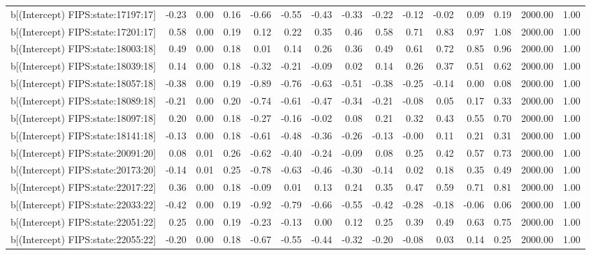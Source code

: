 \begin{table}[ht]
\begin{tabular}{rrrrrrrrrrrrrrr}
  b[(Intercept) FIPS:state:17197:17] & -0.23 & 0.00 & 0.16 & -0.66 & -0.55 & -0.43 & -0.33 & -0.22 & -0.12 & -0.02 & 0.09 & 0.19 & 2000.00 & 1.00 \\ 
  b[(Intercept) FIPS:state:17201:17] & 0.58 & 0.00 & 0.19 & 0.12 & 0.22 & 0.35 & 0.46 & 0.58 & 0.71 & 0.83 & 0.97 & 1.08 & 2000.00 & 1.00 \\ 
  b[(Intercept) FIPS:state:18003:18] & 0.49 & 0.00 & 0.18 & 0.01 & 0.14 & 0.26 & 0.36 & 0.49 & 0.61 & 0.72 & 0.85 & 0.96 & 2000.00 & 1.00 \\ 
  b[(Intercept) FIPS:state:18039:18] & 0.14 & 0.00 & 0.18 & -0.32 & -0.21 & -0.09 & 0.02 & 0.14 & 0.26 & 0.37 & 0.51 & 0.62 & 2000.00 & 1.00 \\ 
  b[(Intercept) FIPS:state:18057:18] & -0.38 & 0.00 & 0.19 & -0.89 & -0.76 & -0.63 & -0.51 & -0.38 & -0.25 & -0.14 & 0.00 & 0.08 & 2000.00 & 1.00 \\ 
  b[(Intercept) FIPS:state:18089:18] & -0.21 & 0.00 & 0.20 & -0.74 & -0.61 & -0.47 & -0.34 & -0.21 & -0.08 & 0.05 & 0.17 & 0.33 & 2000.00 & 1.00 \\ 
  b[(Intercept) FIPS:state:18097:18] & 0.20 & 0.00 & 0.18 & -0.27 & -0.16 & -0.02 & 0.08 & 0.21 & 0.32 & 0.43 & 0.55 & 0.70 & 2000.00 & 1.00 \\ 
  b[(Intercept) FIPS:state:18141:18] & -0.13 & 0.00 & 0.18 & -0.61 & -0.48 & -0.36 & -0.26 & -0.13 & -0.00 & 0.11 & 0.21 & 0.31 & 2000.00 & 1.00 \\ 
  b[(Intercept) FIPS:state:20091:20] & 0.08 & 0.01 & 0.26 & -0.62 & -0.40 & -0.24 & -0.09 & 0.08 & 0.25 & 0.42 & 0.57 & 0.73 & 2000.00 & 1.00 \\ 
  b[(Intercept) FIPS:state:20173:20] & -0.14 & 0.01 & 0.25 & -0.78 & -0.63 & -0.46 & -0.30 & -0.14 & 0.02 & 0.18 & 0.35 & 0.49 & 2000.00 & 1.00 \\ 
  b[(Intercept) FIPS:state:22017:22] & 0.36 & 0.00 & 0.18 & -0.09 & 0.01 & 0.13 & 0.24 & 0.35 & 0.47 & 0.59 & 0.71 & 0.81 & 2000.00 & 1.00 \\ 
  b[(Intercept) FIPS:state:22033:22] & -0.42 & 0.00 & 0.19 & -0.92 & -0.79 & -0.66 & -0.55 & -0.42 & -0.28 & -0.18 & -0.06 & 0.06 & 2000.00 & 1.00 \\ 
  b[(Intercept) FIPS:state:22051:22] & 0.25 & 0.00 & 0.19 & -0.23 & -0.13 & 0.00 & 0.12 & 0.25 & 0.39 & 0.49 & 0.63 & 0.75 & 2000.00 & 1.00 \\ 
  b[(Intercept) FIPS:state:22055:22] & -0.20 & 0.00 & 0.18 & -0.67 & -0.55 & -0.44 & -0.32 & -0.20 & -0.08 & 0.03 & 0.14 & 0.25 & 2000.00 & 1.00 \\ 

\end{tabular}
\end{table}

